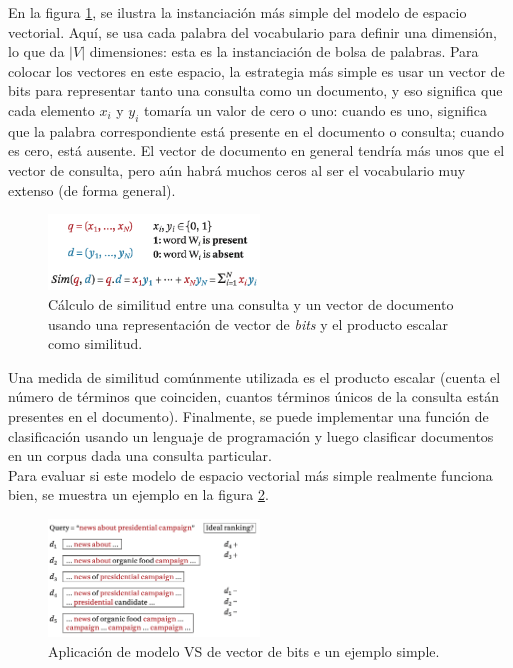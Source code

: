 En la figura \ref{fig:6.3}, se ilustra la instanciación más simple del modelo de espacio vectorial. Aquí, se usa cada palabra del vocabulario para definir una dimensión, lo que da $|V|$ dimensiones: esta es la instanciación de bolsa de palabras. Para colocar los vectores en este espacio, la estrategia más simple es usar un vector de bits para representar tanto una consulta como un documento, y eso significa que cada elemento $x_i$ y $y_i$ tomaría un valor de cero o uno: cuando es uno, significa que la palabra correspondiente está presente en el documento o consulta; cuando es cero, está ausente. El vector de documento en general tendría más unos que el vector de consulta, pero aún habrá muchos ceros al ser el vocabulario muy extenso (de forma general). \\

\begin{figure}[h]
\centering
\includegraphics[width=0.5\textwidth]{fotos/18.png}
\caption{Cálculo de similitud entre una consulta y un vector de documento usando una representación de vector de \textit{bits} y el producto escalar como similitud.}
\label{fig:6.3}
\end{figure}

Una medida de similitud comúnmente utilizada es el producto escalar (cuenta el número de términos que coinciden, cuantos términos únicos de la consulta están presentes en el documento). Finalmente, se puede implementar una función de clasificación usando un lenguaje de programación y luego clasificar documentos en un corpus dada una consulta particular. \\

Para evaluar si este modelo de espacio vectorial más simple realmente funciona bien, se muestra un ejemplo en la figura \ref{fig:6.4}.

\begin{figure}[h]
\centering
\includegraphics[width=0.5\textwidth]{fotos/19.png}
\caption{Aplicación de modelo VS de vector de bits e un ejemplo simple.}
\label{fig:6.4}
\end{figure}

